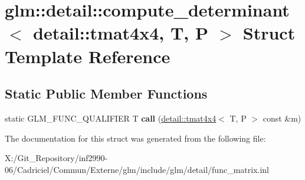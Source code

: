 \hypertarget{structglm_1_1detail_1_1compute__determinant_3_01detail_1_1tmat4x4_00_01_t_00_01_p_01_4}{\section{glm\-:\-:detail\-:\-:compute\-\_\-determinant$<$ detail\-:\-:tmat4x4, T, P $>$ Struct Template Reference}
\label{structglm_1_1detail_1_1compute__determinant_3_01detail_1_1tmat4x4_00_01_t_00_01_p_01_4}
}
\subsection*{Static Public Member Functions}
\begin{DoxyCompactItemize}
\item 
\hypertarget{structglm_1_1detail_1_1compute__determinant_3_01detail_1_1tmat4x4_00_01_t_00_01_p_01_4_aa7fa7eae68f9b10c3ac3a80bca669c98}{static G\-L\-M\-\_\-\-F\-U\-N\-C\-\_\-\-Q\-U\-A\-L\-I\-F\-I\-E\-R T {\bfseries call} (\hyperlink{structglm_1_1detail_1_1tmat4x4}{detail\-::tmat4x4}$<$ T, P $>$ const \&m)}\label{structglm_1_1detail_1_1compute__determinant_3_01detail_1_1tmat4x4_00_01_t_00_01_p_01_4_aa7fa7eae68f9b10c3ac3a80bca669c98}

\end{DoxyCompactItemize}


The documentation for this struct was generated from the following file\-:\begin{DoxyCompactItemize}
\item 
X\-:/\-Git\-\_\-\-Repository/inf2990-\/06/\-Cadriciel/\-Commun/\-Externe/glm/include/glm/detail/func\-\_\-matrix.\-inl\end{DoxyCompactItemize}
